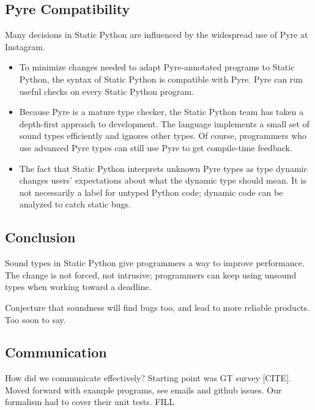 \documentclass[english,cleveref,submission]{programming}
\newcommand{\SP}{Static Python}
\begin{document}
\subsection{Pyre Compatibility}

Many decisions in \SP{} are influenced by the widespread use of Pyre at Instagram.
\begin{itemize}
  \item
    To minimize changes needed to adapt Pyre-annotated programs
    to \SP{}, the syntax of \SP{} is compatible with Pyre.
    Pyre can run useful checks on every \SP{} program.
  \item
    Because Pyre is a mature type checker, the \SP{} team has taken a
    depth-first approach to development.
    The language implements a small set of sound types efficiently and ignores
    other types.
    Of course, programmers who use advanced Pyre types can still use Pyre to
    get compile-time feedback.
  \item
    The fact that \SP{} interprets unknown Pyre types as type dynamic changes
    users' expectations about what the dynamic type should mean.
    It is not necessarily a label for untyped Python code; dynamic code
    can be analyzed to catch static bugs.
\end{itemize}


\subsection{Conclusion}

Sound types in Static Python give programmers a way to improve performance.
The change is not forced, not intrusive;
programmers can keep using unsound types when working toward a deadline.

Conjecture that soundness will find bugs too, and lead to more reliable products.
Too soon to say.


\subsection{Communication}

How did we communicate effectively?
Starting point was GT survey [CITE].
Moved forward with example programs, see emails and github issues.
Our formalism had to cover their unit tests.
FILL

\end{document}
